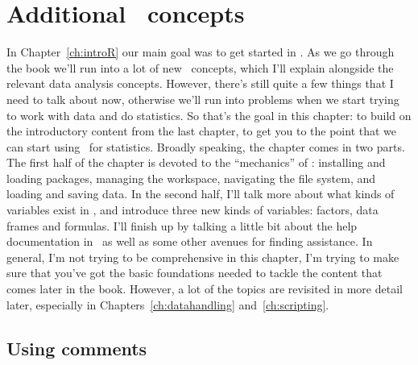 

\chapter{Additional \R\ concepts~\label{ch:mechanics}}


In Chapter~\ref{ch:introR} our main goal was to get started in \R. As we go through the book we'll run into a lot of new  \R\ concepts, which I'll explain alongside the relevant data analysis concepts. However, there's still quite a few things that I need to talk about now, otherwise we'll run into problems when we start trying to work with data and do statistics. So that's the goal in this chapter: to build on the introductory content from the last chapter, to get you to the point that we can start using \R\ for statistics. Broadly speaking, the chapter comes in two parts. The first half of the chapter is devoted to the ``mechanics'' of \R: installing and loading packages, managing the workspace, navigating the file system, and loading and saving data. In the second half, I'll talk more about what kinds of variables exist in \R, and introduce three new kinds of variables: factors, data frames and formulas. I'll finish up by talking a little bit about the help documentation in \R\ as well as some other avenues for finding assistance. In general, I'm not trying to be comprehensive in this chapter, I'm trying to make sure that you've got the basic foundations needed to tackle the content that comes later in the book. However, a lot of the topics are revisited in more detail later, especially in Chapters~\ref{ch:datahandling} and~\ref{ch:scripting}. 

\section{Using comments~\label{sec:comments}}

